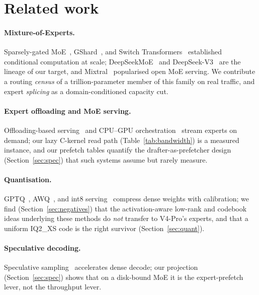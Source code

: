 \documentclass[11pt]{article}
\begin{document}
\section{Related work}
\label{sec:related}

\paragraph{Mixture-of-Experts.} Sparsely-gated MoE~\cite{shazeer2017moe},
GShard~\cite{lepikhin2021gshard}, and Switch
Transformers~\cite{fedus2022switch} established conditional computation at scale;
DeepSeekMoE~\cite{dai2024deepseekmoe} and DeepSeek-V3~\cite{deepseekv3} are the
lineage of our target, and Mixtral~\cite{jiang2024mixtral} popularised open MoE
serving. We contribute a routing \emph{census} of a trillion-parameter member of
this family on real traffic, and expert \emph{splicing} as a domain-conditioned
capacity cut.

\paragraph{Expert offloading and MoE serving.} Offloading-based
serving~\cite{eliseev2023offloading} and CPU--GPU
orchestration~\cite{kong2024fiddler} stream experts on demand; our lazy C-kernel
read path (Table~\ref{tab:bandwidth}) is a measured instance, and our prefetch
tables quantify the drafter-as-prefetcher design (Section~\ref{sec:spec}) that
such systems assume but rarely measure.

\paragraph{Quantisation.} GPTQ~\cite{frantar2023gptq}, AWQ~\cite{lin2024awq}, and
int8 serving~\cite{dettmers2022int8} compress dense weights with calibration; we
find (Section~\ref{sec:negatives}) that the activation-aware low-rank and
codebook ideas underlying these methods do \emph{not} transfer to V4-Pro's
experts, and that a uniform IQ2\_XS code is the right survivor
(Section~\ref{sec:quant}).

\paragraph{Speculative decoding.} Speculative
sampling~\cite{leviathan2023speculative,chen2023accelerating} accelerates dense
decode; our projection (Section~\ref{sec:spec}) shows that on a disk-bound MoE it
is the expert-prefetch lever, not the throughput lever.
\end{document}
